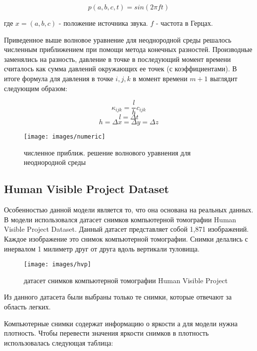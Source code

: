 \documentclass[../main.tex]{subfiles}
\begin{document}
$$p(a, b, c, t) = sin(2 \pi f t)$$

где $x = (a, b, c)$ - положение источника звука. $f$ - частота в Герцах.

Приведенное выше волновое уравнение для неоднородной среды решалось численным приближением при помощи метода конечных разностей. Производные заменялись на разность, давление в точке в последующий момент времени считалось как сумма давлений окружающих ее точек (с коэффициентами). В итоге формула для давления в точке $i, j, k$ в момент времени $m + 1$ выглядит следующим образом:

$$\kappa_{ijk} = \frac{l}{h}c_{ijk}$$
$$l = \Delta t$$
$$h = \Delta x = \Delta y = \Delta z$$

\begin{figure}[H]
\centering
\texttt{[image: images/numeric]}
\caption{численное приближ. решение волнового уравнения для неоднородной среды}
\end{figure}

\subsection{Human Visible Project Dataset}
Особенностью данной модели является то, что она основана на реальных данных. В модели использовался датасет снимков компьютерной томографии Human Visible Project Dataset. Данный датасет представляет собой 1,871 изображений. Каждое изображение это снимок компьютерной томографии. Снимки делались с инервалом 1 милиметр друг от друга вдоль вертикали туловища.

\begin{figure}[H]
\centering
\texttt{[image: images/hvp]}
\caption{датасет снимков компьютерной томографии Human Visible Project}
\end{figure}
Из данного датасета были выбраны только те снимки, которые отвечают за область легких.

Компьютерные снимки содержат информацию о яркости а для модели нужна плотность. Чтобы перевести значения яркости снимков в плотность использовалась следующая таблица:
\end{document}
